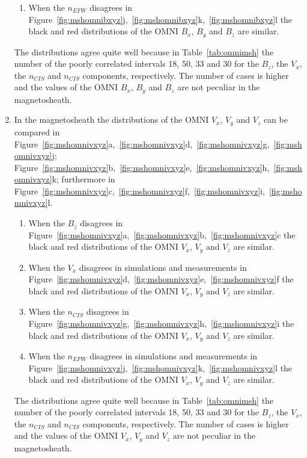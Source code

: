 \documentclass[draft]{agujournal2019}
\begin{document}
\begin{enumerate}
\begin{enumerate}
\item When the $n_{EFW}$ disagrees in Figure~\ref{fig:mshomnibxyz}j,~\ref{fig:mshomnibxyz}k,~\ref{fig:mshomnibxyz}l the black and red distributions of the OMNI $B_{x}$, $B_{y}$ and $B_{z}$ are similar.
\end{enumerate}
The distributions agree quite well because in Table~\ref{tab:omnimsh} the number of the poorly correlated intervals 18, 50, 33 and 30 for the $B_{z}$, the $V_{x}$, the $n_{CIS}$ and $n_{CIS}$ components, respectively. The number of cases is higher and the values of the OMNI $B_{x}$, $B_{y}$ and $B_{z}$ are not peculiar in the magnetosheath.

\item In the magnetosheath the distributions of the OMNI $V_{x}$, $V_{y}$ and $V_{z}$ can be compared in Figure~{\ref{fig:mshomnivxyz}a,~\ref{fig:mshomnivxyz}d,~\ref{fig:mshomnivxyz}g,~\ref{fig:mshomnivxyz}j; Figure~\ref{fig:mshomnivxyz}b,~\ref{fig:mshomnivxyz}e,~\ref{fig:mshomnivxyz}h,~\ref{fig:mshomnivxyz}k; furthermore in Figure~\ref{fig:mshomnivxyz}c,~\ref{fig:mshomnivxyz}f,~\ref{fig:mshomnivxyz}i,~\ref{fig:mshomnivxyz}l.}
\begin{enumerate}
\item When the $B_{z}$ disagrees in Figure~\ref{fig:mshomnivxyz}a,~\ref{fig:mshomnivxyz}b,~\ref{fig:mshomnivxyz}c the black and red distributions of the OMNI $V_{x}$, $V_{y}$ and $V_{z}$ are similar.

\item When the $V_{x}$ disagrees in simulations and measurements in Figure~\ref{fig:mshomnivxyz}d,~\ref{fig:mshomnivxyz}e,~\ref{fig:mshomnivxyz}f the black and red distributions of the OMNI $V_{x}$, $V_{y}$ and $V_{z}$ are similar.

\item When the $n_{CIS}$ disagrees in Figure~\ref{fig:mshomnivxyz}g,~\ref{fig:mshomnivxyz}h,~\ref{fig:mshomnivxyz}i the black and red distributions of the OMNI $V_{x}$, $V_{y}$ and $V_{z}$ are similar.

\item When the $n_{EFW}$ disagrees in simulations and measurements in Figure~\ref{fig:mshomnivxyz}j,~\ref{fig:mshomnivxyz}k,~\ref{fig:mshomnivxyz}l the black and red distributions of the OMNI $V_{x}$, $V_{y}$ and $V_{z}$ are similar.
\end{enumerate}
The distributions agree quite well because in Table~\ref{tab:omnimsh} the number of the poorly correlated intervals 18, 50, 33 and 30 for the $B_{z}$, the $V_{x}$, the $n_{CIS}$ and $n_{CIS}$ components, respectively. The number of cases is higher and the values of the OMNI $V_{x}$, $V_{y}$ and $V_{z}$ are not peculiar in the magnetosheath.


\end{enumerate}
\end{document}
